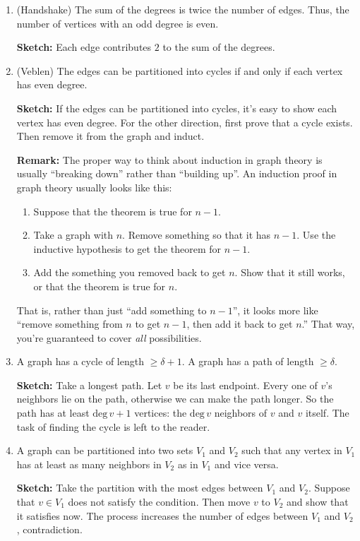 \documentclass[11pt,paper=letter]{scrartcl}
\begin{document}
\begin{enumerate}
  \item (Handshake) The sum of the degrees is twice the number of edges. Thus, the number of vertices with an odd degree is even.

  \textbf{Sketch:} Each edge contributes $2$ to the sum of the degrees.
  \item (Veblen) The edges can be partitioned into cycles if and only if each vertex has even degree.

  \textbf{Sketch:} If the edges can be partitioned into cycles, it's easy to show each vertex has even degree. For the other direction, first prove that a cycle exists. Then remove it from the graph and induct.

  \textbf{Remark:} The proper way to think about induction in graph theory is usually ``breaking down'' rather than ``building up''. An induction proof in graph theory usually looks like this:
  \begin{enumerate}
    \item Suppose that the theorem is true for $n-1$.
    \item Take a graph with $n$. Remove something so that it has $n-1$. Use the inductive hypothesis to get the theorem for $n-1$.
    \item Add the something you removed back to get $n$. Show that it still works, or that the theorem is true for $n$.
  \end{enumerate}
  That is, rather than just ``add something to $n-1$'', it looks more like ``remove something from $n$ to get $n-1$, then add it back to get $n$.'' That way, you're guaranteed to cover \emph{all} possibilities.

  \item A graph has a cycle of length $\geq \delta + 1$. A graph has a path of length $\geq \delta$.

  \textbf{Sketch:} Take a longest path. Let $v$ be its last endpoint. Every one of $v$'s neighbors lie on the path, otherwise we can make the path longer. So the path has at least $\text{deg}\,v + 1$ vertices: the $\text{deg}\,v$ neighbors of $v$ and $v$ itself. The task of finding the cycle is left to the reader.

  \item A graph can be partitioned into two sets $V_1$ and $V_2$ such that any vertex in $V_1$ has at least as many neighbors in $V_2$ as in $V_1$ and vice versa. %

  \textbf{Sketch:} Take the partition with the most edges between $V_1$ and $V_2$. Suppose that $v \in V_1$ does not satisfy the condition. Then move $v$ to $V_2$ and show that it satisfies now. The process increases the number of edges between $V_1$ and $V_2$, contradiction. 
\end{enumerate}
\end{document}
